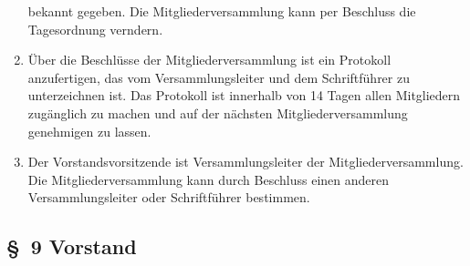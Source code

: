 \documentclass[10pt,a4paper]{scrartcl}
\begin{document}
\begin{enumerate}
		bekannt gegeben. Die Mitgliederversammlung kann per Beschluss die Tagesordnung
		verndern.
	\item {\"U}ber die Beschl{\"u}sse der Mitgliederversammlung ist ein Protokoll anzufertigen,
		das vom Versammlungsleiter und dem Schriftf{\"u}hrer zu unterzeichnen ist.
		Das Protokoll ist innerhalb von 14 Tagen allen Mitgliedern zug{\"a}nglich zu
		machen und auf der n{\"a}chsten Mitgliederversammlung genehmigen zu lassen.
	\item Der Vorstandsvorsitzende ist Versammlungsleiter der Mitgliederversammlung.
		Die Mitgliederversammlung kann durch Beschluss einen anderen Versammlungsleiter
		oder Schrift\-f{\"u}h\-rer bestimmen.
\end{enumerate}
%
%
\subsection*{\S \ 9 Vorstand }
\end{document}
